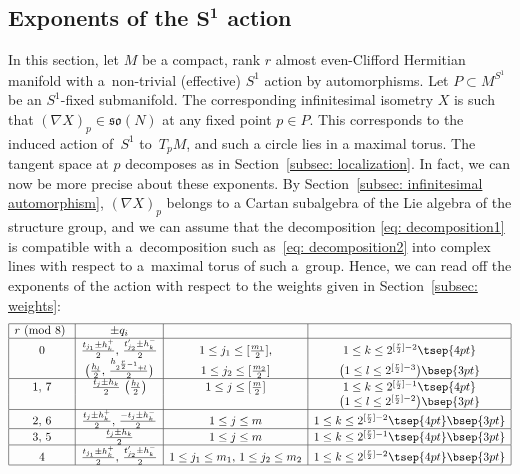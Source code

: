 \documentclass[pdftex]{sigma}
\numberwithin{equation}{section}
\begin{document}
\subsection[Exponents of the $S^1$ action]{Exponents of the $\boldsymbol{S^1}$ action}
In this section, let $M$ be a compact, rank $r$ almost even-Clif\/ford Hermitian manifold with a~non-trivial (ef\/fective) $S^1$ action by automorphisms. Let $P\subset M^{S^1}$ be an $S^1$-f\/ixed submanifold. The corresponding inf\/initesimal isometry $X$ is such that $(\nabla X)_p \in\mathfrak{so}(N)$ at any f\/ixed point $p\in P$. This corresponds to the induced action of~$S^1$ to~$T_pM$, and such a circle lies in a maximal torus. The tangent space at $p$ decomposes as in Section~\ref{subsec: localization}. In fact, we can now be more precise about these exponents. By Section~\ref{subsec: infinitesimal automorphism}, $(\nabla X)_p$ belongs to a Cartan subalgebra of the Lie algebra of the structure group, and we can assume that the decomposition \eqref{eq: decomposition1} is compatible with a~decomposition such as~\eqref{eq: decomposition2} into complex lines with respect to a~maximal torus of such a~group. Hence, we can read of\/f the exponents of the action with respect to the weights given in Section~\ref{subsec: weights}:
\begin{gather*}
\begin{array}{|c|c|c|c|}
 \hline
 r \mbox{\ {\rm (mod 8)} } & \pm q_i & &
\\
\hline
 0 & {t_{j_1}\pm h_k^+\over 2},\, {t_{j_2}'\pm h_k^-\over 2}& 1\leq j_1\leq [{m_1\over 2}], & 1\leq k\leq 2^{[{r\over 2}]-2}\tsep{4pt}
\\
& \big( {h_l\over2}, \, {h_{2^{{r\over 2}-1}+l}\over2} \big) & 1\leq j_2\leq [{m_2\over 2}] & \big(1\leq l\leq 2^{[{r\over 2}]-3}\big)\bsep{3pt}\\
 \hline
 1,\, 7 & {t_j\pm h_k\over 2} \ \big( {h_l\over2} \big) & 1\leq j\leq [{m\over 2}] & 1\leq k\leq 2^{[{r\over 2}]-1} \tsep{4pt}\\
 &&& \big(1\leq l\leq 2^{[{r\over 2}]-2}\big)\bsep{3pt}\\
\hline
 2,\, 6 & {t_j \pm h_k^+\over 2},\, {-t_j \pm h_k^-\over 2} & 1\leq j\leq m & 1\leq k\leq 2^{[{r\over 2}]-2}\tsep{4pt} \bsep{3pt}\\
\hline
 3,\, 5 & {t_j\pm h_k\over 2} & 1\leq j\leq m & 1\leq k\leq 2^{[{r\over 2}]-1}\tsep{4pt} \bsep{3pt} \\
\hline
 4 & {t_{j_1}\pm h_k^+\over 2}, \, {t_{j_2}'\pm h_k^-\over 2} & 1\leq j_1\leq m_1, \, 1\leq j_2\leq m_2 & 1\leq k\leq 2^{[{r\over 2}]-2}\tsep{4pt} \bsep{3pt}\\
\hline
 \end{array}
\end{gather*}
\end{document}
